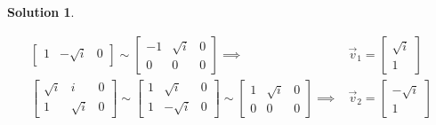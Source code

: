 \documentclass[10pt]{article}
\theoremstyle{definition}
\newtheorem{soln}{Solution}
\begin{document}
\begin{soln}
\begin{enumerate}[label=(\alph*)]
\begin{align*}
\begin{bmatrix}
              1  & -\sqrt{i} & 0
            \end{bmatrix}\sim
            \begin{bmatrix}
              -1 & \sqrt{i} & 0 \\
              0  & 0        & 0
            \end{bmatrix}
            \implies & \vec{v}_1=\begin{bmatrix}
                                   \sqrt{i} \\
                                   1
                                 \end{bmatrix} \\
            \begin{bmatrix}
              \sqrt{i} & i        & 0 \\
              1        & \sqrt{i} & 0
            \end{bmatrix}\sim
            \begin{bmatrix}
              1 & \sqrt{i}  & 0 \\
              1 & -\sqrt{i} & 0
            \end{bmatrix}\sim
            \begin{bmatrix}
              1 & \sqrt{i} & 0 \\
              0 & 0        & 0
            \end{bmatrix}
            \implies & \vec{v}_2=\begin{bmatrix}
                                   -\sqrt{i} \\
                                   1
                                 \end{bmatrix}
          \end{align*}


\end{enumerate}
\end{soln}
\end{document}

